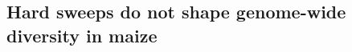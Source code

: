 \documentclass{pnastwo}
\begin{document}
\begin{article}


\subsection{Hard sweeps do not shape genome-wide diversity in maize}


\end{article}
\end{document}

